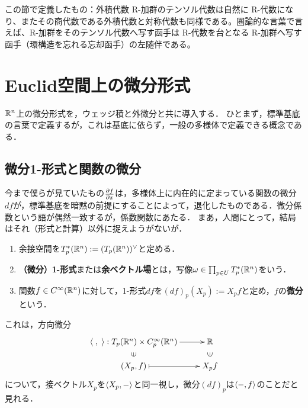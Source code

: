\documentclass[uplatex,dvipdfmx]{jsreport}
\begin{document}
\begin{itembox}[l]{この節で定義したもの：外積代数}
    R-加群のテンソル代数は自然に R-代数になり、またその商代数である外積代数と対称代数も同様である。圏論的な言葉で言えば、R-加群をそのテンソル代数へ写す函手は R-代数を台となる R-加群へ写す函手（環構造を忘れる忘却函手）の左随伴である。
\end{itembox}

\section{Euclid空間上の微分形式}

\begin{tcolorbox}[colframe=ForestGreen, colback=ForestGreen!10!white, breakable ,colbacktitle=ForestGreen!40!white, coltitle=black,fonttitle=\bfseries\sffamily,
    title=]
    $\mathbb{R}^n$上の微分形式を，ウェッジ積と外微分と共に導入する．
    ひとまず，標準基底の言葉で定義するが，これは基底に依らず，一般の多様体で定義できる概念である．
\end{tcolorbox}

\subsection{微分1-形式と関数の微分}

\begin{tcolorbox}[colframe=ForestGreen, colback=ForestGreen!10!white, breakable ,colbacktitle=ForestGreen!40!white, coltitle=black,fonttitle=\bfseries\sffamily,
    title=関数の微分とは余ベクトル場である]
    今まで僕らが見ていたもの$\frac{\partial f}{\partial x}$は，多様体上に内在的に定まっている関数の微分$df$が，標準基底を暗黙の前提にすることによって，退化したものである．微分係数という語が偶然一致するが，係数関数にあたる．
    まあ，人間にとって，結局はそれ（形式と計算）以外に捉えようがないが．
\end{tcolorbox}

\begin{definition}\mbox{}
    \begin{enumerate}
        \item 余接空間を$T^*_p(\mathbb{R}^n):=(T_p(\mathbb{R}^n))^\vee$と定める．
        \item \textbf{（微分）1-形式}または\textbf{余ベクトル場}とは，写像$\omega\in\prod_{p\in U}T^*_p(\mathbb{R}^n)$をいう．
        \item 関数$f\in C^\infty(\mathbb{R}^n)$に対して，1-形式$df$を$(df)_p(X_p):=X_pf$と定め，$f$の\textbf{微分}という．
    \end{enumerate}
\end{definition}
\begin{remarks}
    これは，方向微分
    \[\xymatrix@R-2pc{
        \bracket{\;,\;}:T_p(\R^n)\times C_p^\infty(\R^n)\ar[r]&\R\\
        \rotatebox[origin=c]{90}{$\in$}&\rotatebox[origin=c]{90}{$\in$}\\
        (X_p,f)\ar@{|->}[r]&X_pf
    }\]
    について，接ベクトル$X_p$を$\langle X_p,-\rangle$と同一視し，微分$(df)_p$は$\langle-,f\rangle$のことだと見れる．
\end{remarks}
\end{document}

